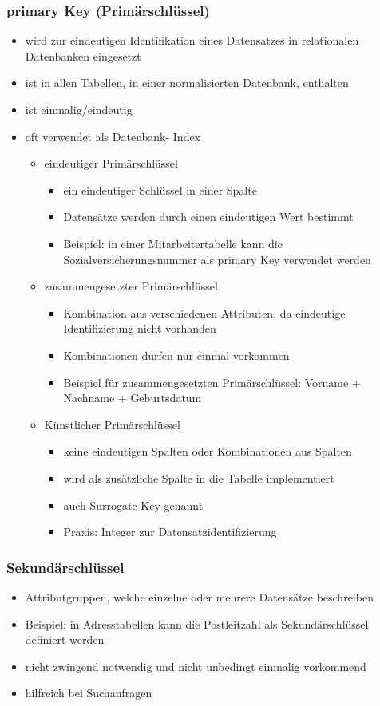\documentclass[12pt,a4paper]{report}
\begin{document}
\begin{onehalfspace}
\subsubsection{primary Key (Primärschlüssel)}
\begin{itemize}
\item wird zur eindeutigen Identifikation eines Datensatzes in relationalen Datenbanken eingesetzt
\item ist in allen Tabellen, in einer normalisierten Datenbank, enthalten
\item ist einmalig/eindeutig
\item oft verwendet als Datenbank- Index
\begin{itemize}
\item eindeutiger Primärschlüssel
\begin{itemize}
\item ein eindeutiger Schlüssel in einer Spalte
\item Datensätze werden durch einen eindeutigen Wert bestimmt
\item Beispiel: in einer  Mitarbeitertabelle kann die Sozialversicherungsnummer als primary Key verwendet werden
\end{itemize}
\item zusammengesetzter Primärschlüssel
\begin{itemize}
\item Kombination aus verschiedenen Attributen, da eindeutige Identifizierung nicht vorhanden
\item Kombinationen dürfen nur einmal vorkommen
\item Beispiel für zusammengesetzten Primärschlüssel: Vorname + Nachname + Geburtsdatum
\end{itemize}
\item Künstlicher Primärschlüssel
\begin{itemize}
\item keine eindeutigen Spalten oder Kombinationen aus Spalten
\item wird als zusätzliche Spalte in die Tabelle implementiert
\item auch Surrogate Key genannt
\item Praxis: Integer zur Datensatzidentifizierung
\end{itemize}
\end{itemize}
\end{itemize}
\subsubsection{Sekundärschlüssel}
\begin{itemize}
\item Attributgruppen, welche einzelne oder mehrere Datensätze beschreiben
\item Beispiel: in Adresstabellen kann die Postleitzahl als Sekundärschlüssel definiert werden
\item nicht zwingend notwendig und nicht unbedingt einmalig vorkommend
\item hilfreich bei Suchanfragen
\end{itemize}

\end{onehalfspace}
\end{document}
